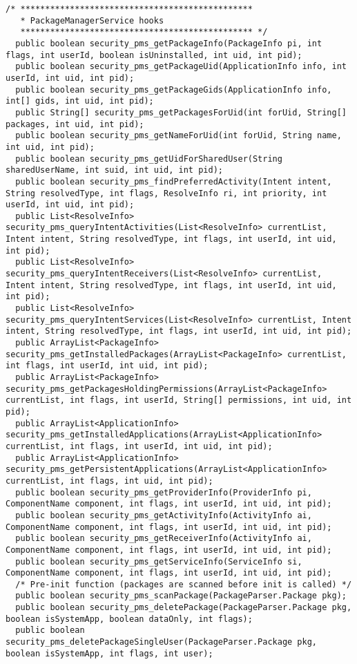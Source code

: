 \documentclass[letterpaper,twocolumn,10pt]{article}
\begin{document}
\begin{lstlisting}[emph={},basicstyle=\footnotesize,caption={Interface for Access Control Policy Modules}]
  /* ***********************************************
   * PackageManagerService hooks
   *********************************************** */
  public boolean security_pms_getPackageInfo(PackageInfo pi, int flags, int userId, boolean isUninstalled, int uid, int pid);
  public boolean security_pms_getPackageUid(ApplicationInfo info, int userId, int uid, int pid);
  public boolean security_pms_getPackageGids(ApplicationInfo info, int[] gids, int uid, int pid);
  public String[] security_pms_getPackagesForUid(int forUid, String[] packages, int uid, int pid);
  public boolean security_pms_getNameForUid(int forUid, String name, int uid, int pid);
  public boolean security_pms_getUidForSharedUser(String sharedUserName, int suid, int uid, int pid);
  public boolean security_pms_findPreferredActivity(Intent intent, String resolvedType, int flags, ResolveInfo ri, int priority, int userId, int uid, int pid);
  public List<ResolveInfo> security_pms_queryIntentActivities(List<ResolveInfo> currentList, Intent intent, String resolvedType, int flags, int userId, int uid, int pid);
  public List<ResolveInfo> security_pms_queryIntentReceivers(List<ResolveInfo> currentList, Intent intent, String resolvedType, int flags, int userId, int uid, int pid);
  public List<ResolveInfo> security_pms_queryIntentServices(List<ResolveInfo> currentList, Intent intent, String resolvedType, int flags, int userId, int uid, int pid);
  public ArrayList<PackageInfo> security_pms_getInstalledPackages(ArrayList<PackageInfo> currentList, int flags, int userId, int uid, int pid);
  public ArrayList<PackageInfo> security_pms_getPackagesHoldingPermissions(ArrayList<PackageInfo> currentList, int flags, int userId, String[] permissions, int uid, int pid);
  public ArrayList<ApplicationInfo> security_pms_getInstalledApplications(ArrayList<ApplicationInfo> currentList, int flags, int userId, int uid, int pid);
  public ArrayList<ApplicationInfo> security_pms_getPersistentApplications(ArrayList<ApplicationInfo> currentList, int flags, int uid, int pid);
  public boolean security_pms_getProviderInfo(ProviderInfo pi, ComponentName component, int flags, int userId, int uid, int pid);
  public boolean security_pms_getActivityInfo(ActivityInfo ai, ComponentName component, int flags, int userId, int uid, int pid);
  public boolean security_pms_getReceiverInfo(ActivityInfo ai, ComponentName component, int flags, int userId, int uid, int pid);
  public boolean security_pms_getServiceInfo(ServiceInfo si, ComponentName component, int flags, int userId, int uid, int pid);
  /* Pre-init function (packages are scanned before init is called) */
  public boolean security_pms_scanPackage(PackageParser.Package pkg);
  public boolean security_pms_deletePackage(PackageParser.Package pkg, boolean isSystemApp, boolean dataOnly, int flags);
  public boolean security_pms_deletePackageSingleUser(PackageParser.Package pkg, boolean isSystemApp, int flags, int user);
  

\end{lstlisting}
\end{document}
